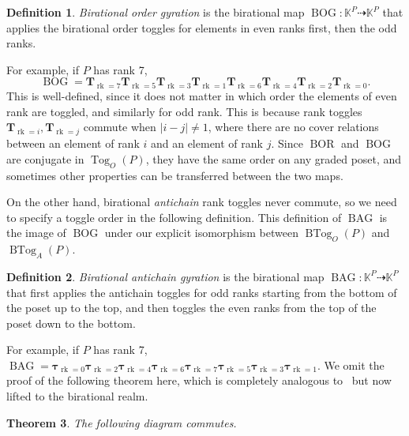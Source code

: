 \documentclass[10pt]{amsart}
\newtheorem{theo}{Theorem}[section]
\theoremstyle{definition}
\newtheorem{defi}[theo]{Definition}
\newcommand{\defn}[1]{\emph{#1}}
\newcommand{\kk}{\mathbb{K}}
\newcommand{\dra}{\dashrightarrow}
\newcommand{\up}{\Delta}
\DeclareMathOperator{\tog}{Tog}
\DeclareMathOperator{\btog}{BTog}
\DeclareMathOperator{\rk}{rk}
\DeclareMathOperator{\BAG}{BAG}
\DeclareMathOperator{\BOG}{BOG}
\DeclareMathOperator{\BOR}{BOR}
\newcommand{\rkT}[1]{\boldsymbol{T}_{\rk=#1}}
\newcommand{\rktau}[1]{\boldsymbol{\tau}_{\rk=#1}}
\begin{document}
\begin{defi}
\defn{Birational order gyration} is the birational map
$\BOG: \kk^P \dra \kk^P$ that applies the birational order toggles for elements in even ranks first, then the odd ranks.
\end{defi}

For example, if $P$ has rank 7,
\[
\BOG=\rkT{7}\rkT{5}\rkT{3}\rkT{1}\rkT{6}\rkT{4}\rkT{2}\rkT{0}.
\]
This is well-defined, since it does not matter in which order the elements of even rank are toggled, and similarly for odd rank.
This is because rank toggles $\rkT{i}, \rkT{j}$ commute when $|i-j|\not= 1$, where there are
no cover relations between an element of rank $i$ and an element of rank $j$. 
Since $\BOR$ and $\BOG$ are conjugate in $\tog_O(P)$,
they have the same order on any graded poset, and sometimes other properties can be transferred between the two maps.

On the other hand, birational \emph{antichain}
rank toggles never commute, so we need to specify a toggle order in the following definition.
This definition of $\BAG$ is the image of $\BOG$
under our explicit isomorphism between $\btog_O(P)$ and $\btog_A(P)$.

\begin{defi}
\defn{Birational antichain gyration} is the birational map
$\BAG:\kk^P \dra \kk^P$ that first applies the antichain toggles for odd ranks starting from the bottom of the poset
up to the top, and then toggles the even ranks from the top of the poset
down to the bottom.
\end{defi}

For example, if $P$ has rank 7,
$\BAG=\rktau{0}\rktau{2}\rktau{4}\rktau{6}\rktau{7}\rktau{5}\rktau{3}\rktau{1}$.
We omit the proof of the following theorem here, which is
completely analogous to~\cite[Theorem~2.34]{antichain-toggling} but now lifted to the birational realm.

\begin{theo}
The following diagram commutes.
\begin{center}
\end{center}
\end{theo}
\end{document}
